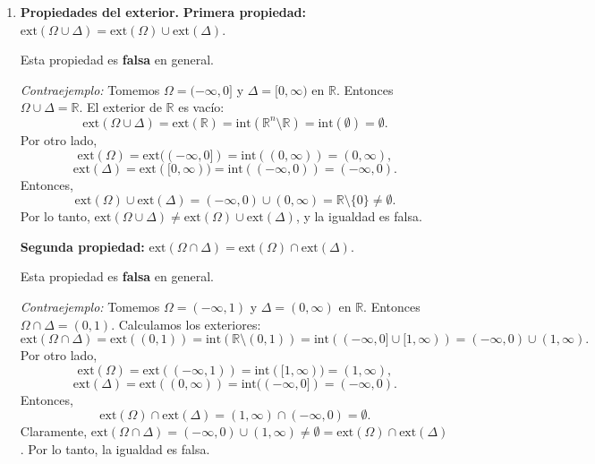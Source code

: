 \documentclass[12pt]{article}
\newcommand{\Ext}{\mathrm{ext}}
\newcommand{\Int}{\mathrm{int}}
\newcommand{\R}{\mathbb R}
\newcommand{\x}{\mathrm x}
\begin{document}
\begin{enumerate}
\begin{enumerate}[(1)]
($\supseteq$) Sea $\x \in \Int(\Omega) \cap \Int(\Delta)$. Entonces $\x \in \Int(\Omega)$ y $\x \in \Int(\Delta)$. Por lo tanto, existen $\varepsilon_1 > 0$ y $\varepsilon_2 > 0$ tales que $B(\x, \varepsilon_1) \subseteq \Omega$ y $B(\x, \varepsilon_2) \subseteq \Delta$. Sea $\varepsilon = \min\{\varepsilon_1, \varepsilon_2\} > 0$. Entonces $B(\x, \varepsilon) \subseteq B(\x, \varepsilon_1) \subseteq \Omega$ y $B(\x, \varepsilon) \subseteq B(\x, \varepsilon_2) \subseteq \Delta$. Por lo tanto, $B(\x, \varepsilon) \subseteq \Omega \cap \Delta$, lo que implica que $\x \in \Int(\Omega \cap \Delta)$.

Así, $\Int(\Omega\cap \Delta) = \Int(\Omega)\cap \Int(\Delta)$.

\item \textbf{Propiedades del exterior.}
\textbf{Primera propiedad:} $\Ext(\Omega\cup \Delta) = \Ext(\Omega)\cup \Ext(\Delta)$.

Esta propiedad es \textbf{falsa} en general.

\textit{Contraejemplo:} Tomemos $\Omega = (-\infty, 0]$ y $\Delta = [0, \infty)$ en $\R$. Entonces $\Omega \cup \Delta = \R$. El exterior de $\R$ es vacío:
\[
\Ext(\Omega \cup \Delta) = \Ext(\R) = \Int(\R^n \setminus \R) = \Int(\emptyset) = \emptyset.
\]
Por otro lado,
\[
\Ext(\Omega) = \Ext((-\infty, 0]) = \Int((0, \infty)) = (0, \infty),
\]
\[
\Ext(\Delta) = \Ext([0, \infty)) = \Int((-\infty, 0)) = (-\infty, 0).
\]
Entonces,
\[
\Ext(\Omega) \cup \Ext(\Delta) = (-\infty, 0) \cup (0, \infty) = \R \setminus \{0\} \neq \emptyset.
\]
Por lo tanto, $\Ext(\Omega\cup \Delta) \neq \Ext(\Omega)\cup \Ext(\Delta)$, y la igualdad es falsa.

\textbf{Segunda propiedad:} $\Ext(\Omega\cap \Delta) = \Ext(\Omega)\cap \Ext(\Delta)$.

Esta propiedad es \textbf{falsa} en general.

\textit{Contraejemplo:} Tomemos $\Omega = (-\infty, 1)$ y $\Delta = (0, \infty)$ en $\R$. Entonces $\Omega \cap \Delta = (0, 1)$. Calculamos los exteriores:
\[
\Ext(\Omega \cap \Delta) = \Ext((0,1)) = \Int(\R \setminus (0,1)) = \Int((-\infty, 0] \cup [1, \infty)) = (-\infty, 0) \cup (1, \infty).
\]
Por otro lado,
\[
\Ext(\Omega) = \Ext((-\infty, 1)) = \Int([1, \infty)) = (1, \infty),
\]
\[
\Ext(\Delta) = \Ext((0, \infty)) = \Int((-\infty, 0]) = (-\infty, 0).
\]
Entonces,
\[
\Ext(\Omega) \cap \Ext(\Delta) = (1, \infty) \cap (-\infty, 0) = \emptyset.
\]
Claramente, $\Ext(\Omega \cap \Delta) = (-\infty, 0) \cup (1, \infty) \neq \emptyset = \Ext(\Omega) \cap \Ext(\Delta)$. Por lo tanto, la igualdad es falsa.
\end{enumerate}


\end{enumerate}
\end{document}
